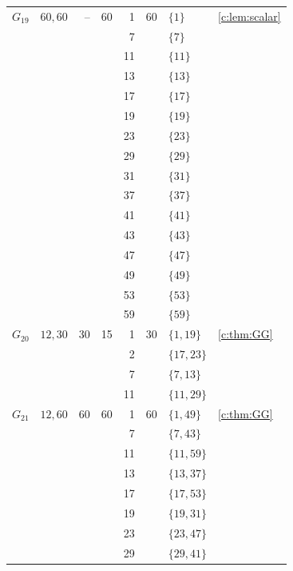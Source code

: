 \documentclass[11pt]{amsart}
\theoremstyle{definition}
\begin{document}
\begin{longtable}{@{}lL{.24\textwidth}rrrrL{.26\textwidth}L{.14\textwidth}@{}}
\midrule[.25pt]
$G_{19}$ & $60,\allowbreak 60$ & -- & 60 & 1 & 60 & $\{1\}$ & \cref{c:lem:scalar} \\*
 &  &  &  & 7 &  & $\{7\}$ &  \\*
 &  &  &  & 11 &  & $\{11\}$ &  \\*
 &  &  &  & 13 &  & $\{13\}$ &  \\*
 &  &  &  & 17 &  & $\{17\}$ &  \\*
 &  &  &  & 19 &  & $\{19\}$ &  \\*
 &  &  &  & 23 &  & $\{23\}$ &  \\*
 &  &  &  & 29 &  & $\{29\}$ &  \\*
 &  &  &  & 31 &  & $\{31\}$ &  \\*
 &  &  &  & 37 &  & $\{37\}$ &  \\*
 &  &  &  & 41 &  & $\{41\}$ &  \\*
 &  &  &  & 43 &  & $\{43\}$ &  \\*
 &  &  &  & 47 &  & $\{47\}$ &  \\*
 &  &  &  & 49 &  & $\{49\}$ &  \\*
 &  &  &  & 53 &  & $\{53\}$ &  \\*
 &  &  &  & 59 &  & $\{59\}$ &  \\
\midrule[.25pt]
$G_{20}$ & $12,\allowbreak 30$ & 30 & 15 & 1 & 30 & $\{1,\allowbreak 19\}$ & \cref{c:thm:GG} \\*
 &  &  &  & 2 &  & $\{17,\allowbreak 23\}$ &  \\*
 &  &  &  & 7 &  & $\{7,\allowbreak 13\}$ &  \\*
 &  &  &  & 11 &  & $\{11,\allowbreak 29\}$ &  \\
\midrule[.25pt]
$G_{21}$ & $12,\allowbreak 60$ & 60 & 60 & 1 & 60 & $\{1,\allowbreak 49\}$ & \cref{c:thm:GG} \\*
 &  &  &  & 7 &  & $\{7,\allowbreak 43\}$ &  \\*
 &  &  &  & 11 &  & $\{11,\allowbreak 59\}$ &  \\*
 &  &  &  & 13 &  & $\{13,\allowbreak 37\}$ &  \\*
 &  &  &  & 17 &  & $\{17,\allowbreak 53\}$ &  \\*
 &  &  &  & 19 &  & $\{19,\allowbreak 31\}$ &  \\*
 &  &  &  & 23 &  & $\{23,\allowbreak 47\}$ &  \\*
 &  &  &  & 29 &  & $\{29,\allowbreak 41\}$ &  \\

\end{longtable}
\end{document}
